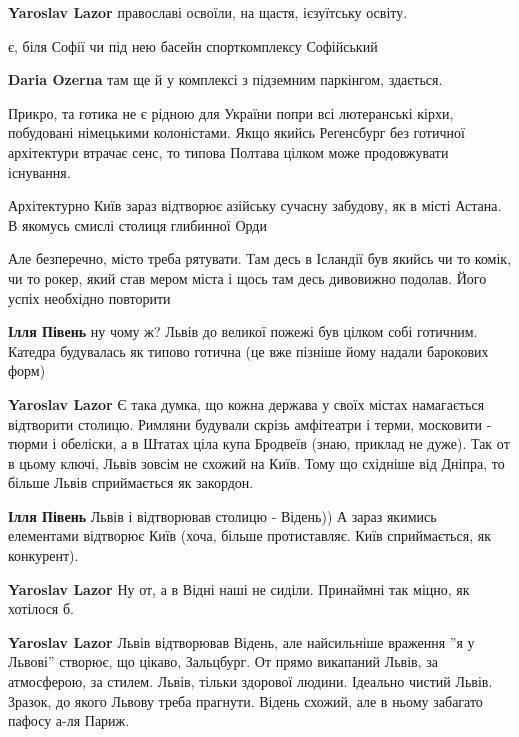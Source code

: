 \begin{itemize}
\begin{itemize}
\textbf{Yaroslav Lazor} православі освоїли, на щастя, ієзуїтську освіту.
\end{itemize} %

є, біля Софії чи під нею басейн спорткомплексу Софійський

\begin{itemize} %
\textbf{Daria Ozerna} там ще й у комплексі з підземним паркінгом, здається.
\end{itemize} %


Прикро, та готика не є рідною для України попри всі лютеранські кірхи,
побудовані німецькими колоністами. Якщо якийсь Регенсбург без готичної
архітектури втрачає сенс, то типова Полтава цілком може продовжувати існування.

\begin{itemize} %
Архітектурно Київ зараз відтворює азійську сучасну забудову, як в місті Астана. В якомусь смислі столиця глибинної Орди

Але безперечно, місто треба рятувати. Там десь в Ісландії був якийсь чи то комік, чи то рокер, який став мером міста і щось там десь дивовижно подолав. Його успіх необхідно повторити

\textbf{Ілля Півень} ну чому ж? Львів до великої пожежі був цілком собі готичним. Катедра будувалась як типово готична (це вже пізніше йому надали барокових форм)

\textbf{Yaroslav Lazor} Є така думка, що кожна держава у своїх містах намагається відтворити столицю. Римляни будували скрізь амфітеатри і терми, московити - тюрми і обеліски, а в Штатах ціла купа Бродвеїв (знаю, приклад не дуже). Так от в цьому ключі, Львів зовсім не схожий на Київ. Тому що східніше від Дніпра, то більше Львів сприймається як закордон.

\textbf{Ілля Півень} Львів і відтворював столицю - Відень))
А зараз якимись елементами відтворює Київ (хоча, більше протиставляє. Київ сприймається, як конкурент).

\textbf{Yaroslav Lazor} Ну от, а в Відні наші не сиділи. Принаймні так міцно, як хотілося б.

\textbf{Yaroslav Lazor} Львів відтворював Відень, але найсильніше враження ''я у Львові'' створює, що цікаво, Зальцбург.
От прямо викапаний Львів, за атмосферою, за стилем. Львів, тільки здорової людини. Ідеально чистий Львів. Зразок, до якого Львову треба прагнути.
Відень схожий, але в ньому забагато пафосу а-ля Париж.
\end{itemize} %


\end{itemize}
